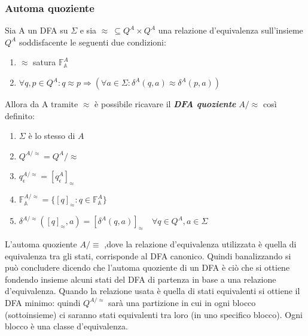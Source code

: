 \subsubsection{Automa quoziente}
\label{subsub:aqu}
Sia A un \ac{DFA} su $\Sigma$ e sia  $\approx \: \subseteq Q^{A}\!\!\times{}\!Q^{A}$ una relazione d'equivalenza sull'insieme $Q^{A}$ soddisfacente le seguenti due condizioni:
\begin{enumerate}[label=(\roman*)]
\item $\approx$ satura $\mathbb{F}_{\mathbb{A}}^{A}$
\item $\forall q,p \in Q^{A} : q \approx p \Rightarrow (\forall a \in \Sigma : \delta^{A}(q,a) \approx \delta^{A}(p,a) )$ 
\end{enumerate}
Allora da A tramite $\approx$ è possibile ricavare il \textit{\textbf{DFA quoziente}} \textbf{$A/\!\!\approx$} così definito:
\begin{enumerate}
\item $\Sigma$ è lo stesso di $A$
\item $Q^{A/\!\approx} = Q^{A}/\!\!\approx$
\item $q_\epsilon^{A/\!\approx} = [q_\epsilon^{A}]_\approx$
\item $\mathbb{F}_\mathbb{A}^{A/\!\approx} = \{[q]_\approx : q \in \mathbb{F}_\mathbb{A}^{A}\}$
\item $\delta^{A/\!\approx}([q]_\approx,a) = [\delta^{A}(q,a)]_\approx \quad \forall q \in Q^{A},a\in{\Sigma}$
\end{enumerate}
L'automa quoziente $A/\!\equiv$ ,dove la relazione d'equivalenza utilizzata è quella di equivalenza tra gli stati, corrisponde al \ac{DFA} canonico. Quindi banalizzando si può concludere dicendo che l'automa quoziente di un \ac{DFA} è ciò che si ottiene fondendo insieme alcuni stati del \ac{DFA} di partenza in base a una relazione d'equivalenza. Quando la relazione usata è quella di stati equivalenti si ottiene il DFA minimo: quindi $Q^{A/\!\approx}$ sarà una partizione in cui in ogni blocco (sottoinsieme) ci saranno stati equivalenti tra loro (in uno specifico blocco). Ogni blocco è una classe d'equivalenza.

